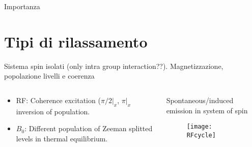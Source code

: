 \begin{frame}{Importanza }
    
\end{frame}

\section{Tipi di rilassamento}

\begin{frame}{Sistema spin isolati (only intra group interaction??). Magnetizzazione, popolazione livelli e coerenza}
\begin{columns}[T]
\begin{column}{0.5\textwidth}
\begin{itemize}
\item RF: Coherence excitation ($\pi/2|_x$, $\pi|_x$ inversion of population.
\item $B_0$: Different population of Zeeman splitted levels in thermal equilibrium.
\end{itemize}
\end{column}
\begin{column}{0.5\textwidth}
\begin{block}{Spontaneous/induced emission in system of spin}
\begin{figure}[!ht]\texttt{[image: RFcycle]}\label{fig:RFcycle}\end{figure}
\end{block}
\end{column}
\end{columns}
\end{frame}

